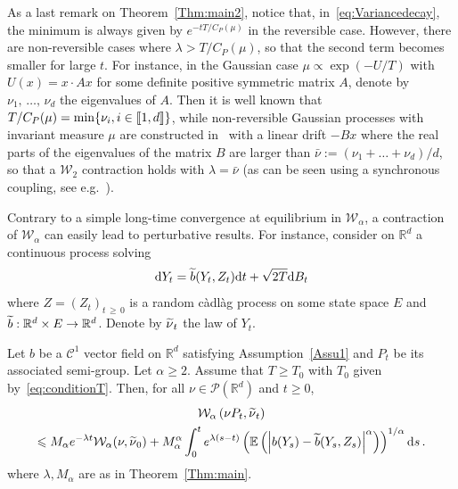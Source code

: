 \documentclass[AHL,Unicode,longabstracts,published]{cedram}
\newcommand{\llbracket}{\mathopen{[\mkern -2.7mu[}}
\newcommand{\rrbracket}{\mathclose{]\mkern -2.7mu]}}
\newcommand{\R}{\mathbb R}
\newcommand{\bbE}{\mathbb E}
\newcommand{\clP}{\mathcal P}
\newcommand{\clC}{\mathcal C}
\newcommand{\clW}{\mathcal W}
\newcommand{\dd}{\mathrm{d}}
\newcommand{\1}{\mathbbm{1}}
\let\oldtilde\tilde
\renewcommand*{\tilde}[1]{\mathchoice{\widetilde{#1}}{\widetilde{#1}}{\oldtilde{#1}}{\oldtilde{#1}}}
\newcommand{\R}{\mathbb R}
\newcommand{\clW}{\mathcal W}
\begin{document}
As a last remark on Theorem~\ref{Thm:main2}, notice that, in~\eqref{eq:Variancedecay}, the minimum is always given by $e^{-tT/C_P(\mu)}$ in the reversible case. However, there are non-reversible cases where $\lambda> T/C_P(\mu)$, so that the second term becomes smaller for large $t$. For instance, in the Gaussian case $\mu \propto \exp(- U/T)$ with $U(x) = x\cdot Ax$ for some definite positive symmetric matrix $A$, denote by $\nu_1,\,\dots,\,\nu_d$ the eigenvalues of $A$. Then it is well known that $T/C_P(\mu) = \min\{ \nu_i,i\in\llbracket 1,d\rrbracket\}$, while non-reversible Gaussian processes with invariant measure $\mu$ are constructed in~\cite{Lelievre2012} with a linear drift $-Bx$ where the real parts of the eigenvalues of the matrix $B$ are larger than $\bar\nu := (\nu_1+\dots+\nu_d)/d$, so that a $\clW_2$ contraction holds with $\lambda = \bar\nu$ (as can be seen using a synchronous coupling, see e.g.~\cite{MonmarcheContraction}).


Contrary to a simple long-time convergence at equilibrium in $\clW_\alpha$, a contraction of $\clW_\alpha$ can easily lead to perturbative results. For instance, consider on $\R^d$ a continuous process solving
\begin{equation}\label{eq:EDSpertubée}
\dd Y_t = \tilde b(Y_t,Z_t) \dd t + \sqrt{2T}\dd B_t
\end{equation}
where $Z=(Z_t)_{t\,\geqslant\,0}$ is a random càdlàg process on some state space $E$ and $\tilde b :\R^d\times E\linebreak\rightarrow \R^d$. Denote by $\tilde\nu_t$ the law of $Y_t$.

\begin{prop}\label{prop:perturbation}
Let $b$ be a $\clC^1$ vector field on $\R^d$ satisfying Assumption~\ref{Assu1} and $P_t$ be its associated semi-group. Let $\alpha\geqslant 2$. Assume that $T\geqslant T_0$ with $T_0$ given by~\eqref{eq:conditionT}. Then, for all $\nu\in\clP(\R^d)$ and $t\geqslant 0$,
\begin{multline}\label{eq:perturb}
\clW_\alpha\left(\nu P_t,\tilde \nu_t\right) \\
\leqslant M_\alpha e^{-\lambda t} \clW_\alpha(\nu,\tilde \nu_0)+ M_\alpha^\alpha \int_0^t e^{\lambda (s-t)} \left( \bbE \left( \left| b(Y_s) - \tilde b(Y_s,Z_s)\right|^\alpha\right)\right)^{1/\alpha}\dd s\,.
\end{multline}
where $\lambda,M_\alpha$ are as in Theorem~\ref{Thm:main}.
\end{prop}
\end{document}
